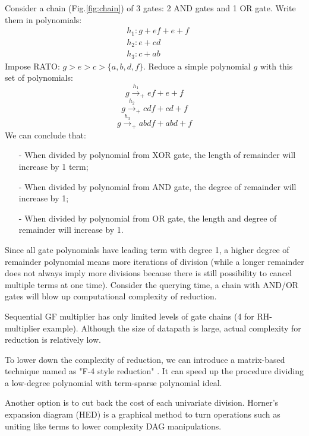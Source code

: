 \begin{Example}
Consider a chain (Fig.\ref{fig:chain}) of 3 gates: 2 AND gates and 1 OR gate. Write them in polynomials:
\begin{align*}
&h_1:g+ef+e+f\\
&h_2:e+cd\\
&h_3:c+ab
\end{align*}
Impose RATO: $g>e>c>\{a,b,d,f\}$. Reduce a simple polynomial $g$ with this set of polynomials:
$$g\xrightarrow{h_1}_{+} ef+e+f$$
$$g\xrightarrow{h_2}_{+} cdf+cd+f$$
$$g\xrightarrow{h_3}_{+} abdf+abd+f$$
We can conclude that:
\begin{itemize}
\item[-] When divided by polynomial from XOR gate, the length of remainder will increase by 1 term;
\item[-] When divided by polynomial from AND gate, the degree of remainder will increase by 1;
\item[-] When divided by polynomial from OR gate, the length and degree of remainder will increase by 1.
\end{itemize}
Since all gate polynomials have leading term with degree 1, a higher degree of remainder polynomial means
 more iterations of division (while a longer remainder does not always imply more divisions because
 there is still possibility to cancel multiple terms at one time). 
 Consider the querying time, a chain with AND/OR gates will blow up computational complexity of
reduction.

Sequential GF multiplier has only limited levels of gate chains (4 for RH-multiplier example). Although the size of 
datapath is large, actual complexity for reduction is relatively low.
\end{Example}

To lower down the complexity of reduction, we can introduce a matrix-based technique named as "F-4 style reduction" \cite{F4reduce}. 
It can speed up the procedure dividing a low-degree polynomial with term-sparse polynomial ideal. 

Another option is to cut back the cost of each univariate division. Horner's expansion diagram (HED)\cite{alizadeh2010modular}
is a graphical method to turn operations such as uniting like terms to lower complexity DAG manipulations.

